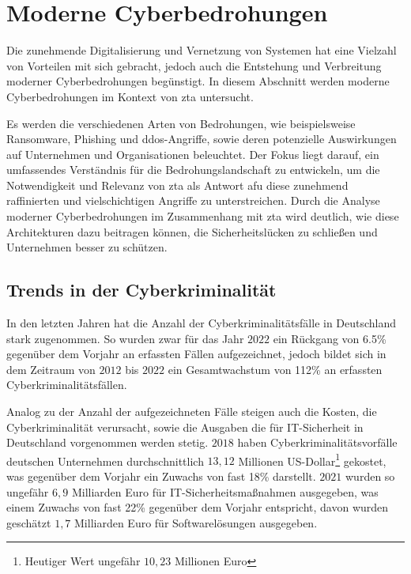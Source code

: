 \newpage


\section{Moderne Cyberbedrohungen}\label{sec:moderne-cyberbedrohungen}
Die zunehmende Digitalisierung und Vernetzung von Systemen hat eine Vielzahl von Vorteilen mit sich gebracht, jedoch auch die Entstehung und Verbreitung moderner Cyberbedrohungen begünstigt.
In diesem Abschnitt werden moderne Cyberbedrohungen im Kontext von \ac{zta} untersucht.

Es werden die verschiedenen Arten von Bedrohungen, wie beispielsweise Ransomware, Phishing und \ac{ddos}-Angriffe, sowie deren potenzielle Auswirkungen auf Unternehmen und Organisationen beleuchtet.
Der Fokus liegt darauf, ein umfassendes Verständnis für die Bedrohungslandschaft zu entwickeln, um die Notwendigkeit und Relevanz von \ac{zta} als Antwort afu diese zunehmend raffinierten und vielschichtigen Angriffe zu unterstreichen.
Durch die Analyse moderner Cyberbedrohungen im Zusammenhang mit \ac{zta} wird deutlich, wie diese Architekturen dazu beitragen können, die Sicherheitslücken zu schließen und Unternehmen besser zu schützen.

\subsection{Trends in der Cyberkriminalität}\label{subsec:trends-und-entwicklungen-in-der-cyberkriminalitat}
In den letzten Jahren hat die Anzahl der Cyberkriminalitätsfälle in Deutschland stark zugenommen.
So wurden zwar für das Jahr $2022$ ein Rückgang von 6.5\% gegenüber dem Vorjahr an erfassten Fällen aufgezeichnet, jedoch bildet sich in dem Zeitraum von $2012$ bis $2022$ ein Gesamtwachstum von 112\% an erfassten Cyberkriminalitätsfällen\autocite[\vglf][]{bka-cyberkriminalitaet}.

Analog zu der Anzahl der aufgezeichneten Fälle steigen auch die Kosten, die Cyberkriminalität verursacht, sowie die Ausgaben die für IT-Sicherheit in Deutschland vorgenommen werden stetig.
$2018$ haben Cyberkriminalitätsvorfälle deutschen Unternehmen durchschnittlich $13,12$ Millionen US-Dollar\footnote{Heutiger Wert ungefähr $10,23$ Millionen Euro} gekostet, was gegenüber dem Vorjahr ein Zuwachs von fast 18\% darstellt\autocite[\vglf][]{accenture-cyberkrime-kosten}.
$2021$ wurden so ungefähr $6,9$ Milliarden Euro für IT-Sicherheitsmaßnahmen ausgegeben, was einem Zuwachs von fast 22\% gegenüber dem Vorjahr entspricht\autocite[\vglf][]{bitkom-itsicherheit}, davon wurden geschätzt $1,7$ Milliarden Euro für Softwarelösungen ausgegeben\autocite[\vglf][]{bitkom-itsicherheit-segment}.

